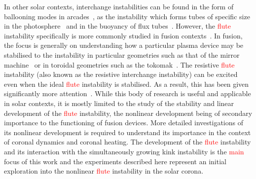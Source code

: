 \documentclass[12pt]{article}
\newcommand{\rs}[2]{\textcolor{red}{#2}}
\begin{document}
In other solar contexts, interchange instabilities can be found in the
form of ballooning modes in
arcades~\cite{hoodBallooningInstabilitiesSolar1986}, as the
instability which forms tubes of specific size in the
photosphere~\cite{bunteInterchangeInstabilitySolar1993} and in the
buoyancy of flux
tubes~\cite{schuesslerInterchangeInstabilitySmall1984}. However, the
\rs{fluting}{flute} instability specifically is more commonly studied in fusion
contexts~\cite{mikhailovskiiInstabilitiesConfinedPlasma1998,zhengAdvancedTokamakStability2015,wessonHydromagneticStabilityTokamaks1978}. In
fusion, the focus is generally on understanding how a particular
plasma device may be stabilised to the instability in particular
geometries such as that of the mirror
machine~\cite{jungwirthTheoryFluteInstability1965} or in toroidal
geometries such as the
tokomak~\cite{shafranovFluteInstabilityCurrentcarrying1968}. The
resistive \rs{fluting}{flute} instability (also known as the resistive interchange
instability) can be excited even when the ideal \rs{fluting}{flute} instability is
stabilised. As a result, this has been given significantly more
attention~\cite{johnsonResistiveInterchangesNegativeV1967,correa-restrepoResistiveBallooningModes1983}. While
this body of research is useful and applicable in solar contexts, it
is mostly limited to the study of the stability and linear development
of the \rs{fluting}{flute} instability, the nonlinear development being of
secondary importance to the functioning of fusion devices. More
detailed investigations of its nonlinear development is required to
understand its importance in the context of coronal dynamics and
coronal heating. The development of the \rs{fluting}{flute} instability and its
interaction with the simultaneously growing kink instability is the
\rs{}{main} focus of this work and the experiments described here represent an
initial exploration into the nonlinear \rs{fluting}{flute} instability in the
solar corona. \rs{Of particular interest is the effect of anisotropic
viscosity, which is found to strongly affect the growth of the \rs{fluting}{flute}
instability.}{}
\end{document}
